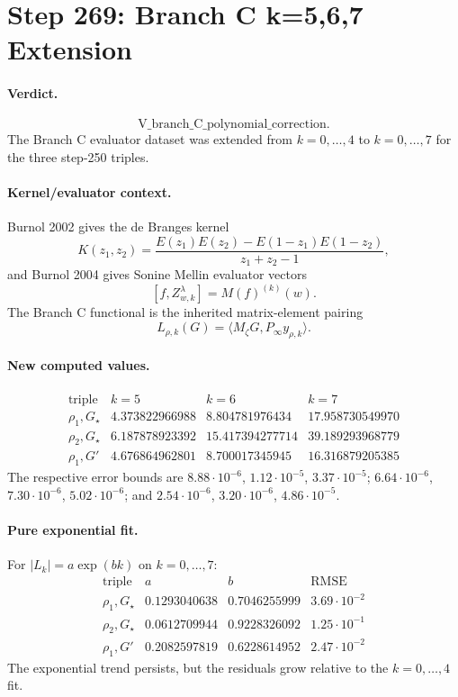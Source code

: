 \section*{Step 269: Branch C k=5,6,7 Extension}

\paragraph{Verdict.}
\[
\mathrm{V\_branch\_C\_polynomial\_correction}.
\]
The Branch C evaluator dataset was extended from \(k=0,\ldots,4\) to
\(k=0,\ldots,7\) for the three step-250 triples.

\paragraph{Kernel/evaluator context.}
Burnol 2002 gives the de Branges kernel
\[
K(z_1,z_2)=
\frac{E(z_1)E(z_2)-E(1-z_1)E(1-z_2)}{z_1+z_2-1},
\]
and Burnol 2004 gives Sonine Mellin evaluator vectors
\[
[f,Z^\lambda_{w,k}]=M(f)^{(k)}(w).
\]
The Branch C functional is the inherited matrix-element pairing
\[
L_{\rho,k}(G)=\langle M_\zeta G,P_\infty y_{\rho,k}\rangle.
\]

\paragraph{New computed values.}
\[
\begin{array}{c|ccc}
\text{triple} & k=5 & k=6 & k=7\\
\hline
\rho_1,G_\star & 4.373822966988 & 8.804781976434 & 17.958730549970\\
\rho_2,G_\star & 6.187878923392 & 15.417394277714 & 39.189293968779\\
\rho_1,G' & 4.676864962801 & 8.700017345945 & 16.316879205385
\end{array}
\]
The respective error bounds are \(8.88\cdot10^{-6}\),
\(1.12\cdot10^{-5}\), \(3.37\cdot10^{-5}\);
\(6.64\cdot10^{-6}\), \(7.30\cdot10^{-6}\), \(5.02\cdot10^{-6}\);
and \(2.54\cdot10^{-6}\), \(3.20\cdot10^{-6}\), \(4.86\cdot10^{-5}\).

\paragraph{Pure exponential fit.}
For \( |L_k|=a\exp(bk)\) on \(k=0,\ldots,7\):
\[
\begin{array}{c|ccc}
\text{triple} & a & b & \mathrm{RMSE}\\
\hline
\rho_1,G_\star & 0.1293040638 & 0.7046255999 & 3.69\cdot10^{-2}\\
\rho_2,G_\star & 0.0612709944 & 0.9228326092 & 1.25\cdot10^{-1}\\
\rho_1,G' & 0.2082597819 & 0.6228614952 & 2.47\cdot10^{-2}
\end{array}
\]
The exponential trend persists, but the residuals grow relative to the
\(k=0,\ldots,4\) fit.

